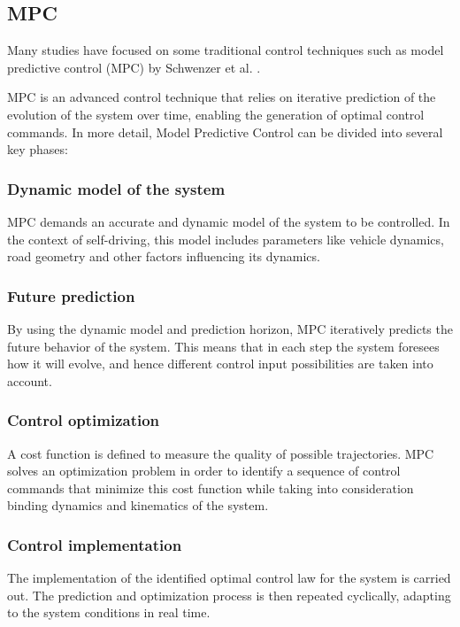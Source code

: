 \documentclass[conference]{IEEEtran}
\begin{document}
%
%
%
\subsection{MPC}

Many studies have focused on some traditional control techniques such as model predictive control (MPC) by Schwenzer et al. \cite{MPC}.  

MPC is an advanced control technique that relies on iterative prediction of the evolution of the system over time, enabling the generation of optimal control commands.
%
In more detail, Model Predictive Control can be divided into several key phases:

\subsubsection{Dynamic model of the system}
MPC demands an accurate and dynamic model of the system to be controlled.
%
In the context of self-driving, this model includes parameters like vehicle dynamics, road geometry and other factors influencing its dynamics.

\subsubsection{Future prediction}
 By using the dynamic model and prediction horizon, MPC iteratively predicts the future behavior of the system.
%
This means that in each step the system foresees how it will evolve, and hence different control input possibilities are taken into account.

\subsubsection{Control optimization}
A cost function is defined to measure the quality of possible trajectories.
%
MPC solves an optimization problem in order to identify a sequence of control commands that minimize this cost function while taking into consideration binding dynamics and kinematics of the system.

\subsubsection{Control implementation}
The implementation of the identified optimal control law for the system is carried out.
%
The prediction and optimization process is then repeated cyclically, adapting to the system conditions in real time.
\end{document}
